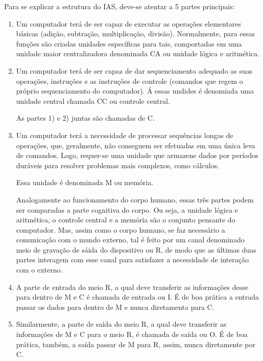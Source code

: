 \documentclass{article}
\begin{document}
Para se explicar a estrutura do IAS, deve-se atentar a 5 partes principais:

\begin{enumerate}
    \item Um computador terá de ser capaz de executar as
	operações elementares básicas (adição, subtração, multiplicação,
	divisão). Normalmente, para essas funções são criadas unidades
	específicas para tais, comportadas em uma unidade maior
	centralizadora denominada CA ou unidade lógica e aritmética.

    \item Um computador terá de ser capaz de dar sequenciamento adequado as
	suas operações, instruções e as instruções de controle (comandos que
	regem o próprio sequenciamento do computador). Á essas undides é
	denomiada uma unidade central chamada CC ou controle central.

	As partes 1) e 2) juntas são chamadas de C. 

    \item Um computador terá a necessidade de processar sequências longas de
	operações, que, geralmente, não conseguem ser efetuadas em uma única
	leva de comandos. Logo, requer-se uma unidade que armazene dados por
	períodos duráveis para resolver problemas mais complexos, como
	cálculos.

	Essa unidade é denominada M ou memória.

	Analogamente ao funcionamento do corpo humano, essas três partes podem
	ser comparadas a parte cognitiva do corpo. Ou seja, a unidade lógica e
	aritmética, o controle central e a memória são o conjunto pensante do
	computador. Mas, assim como o corpo humano, se faz necessário a
	comunicação com o mundo externo, tal é feito por um canal denominado
	meio de gravação de sáida do dispositivo ou R, de modo que as últimas
	duas partes interagem com esse canal para satisfazer a necessidade de
	interação com o externo. 

    \item A parte de entrada do meio R, a qual deve transferir as informações
	desse para dentro de M e C é chamada de entrada ou I. É de boa prática a
	entrada passar os dados para dentro de M e nunca diretamenta para C. 

    \item Similarmente, a parte de saída do meio R, a qual deve transferir as
	informações de M e C para o meio R, é chamada de saída ou O. É de boa
	prática, também, a saída passar de M para R, assim, nunca diretamente
	por C. 
\end{enumerate}
\end{document}

